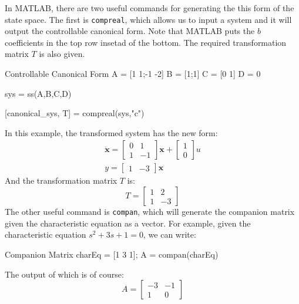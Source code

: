 In MATLAB, there are two useful commands for generating the this form of the state space. The first is \texttt{compreal}, which allows us to input a system and it will output the controllable canonical form. Note that MATLAB puts the $b$ coefficients in the top row insetad of the bottom. The required transformation matrix $T$ is also given.
\begin{matlabscript}{Controllable Canonical Form}
A = [1 1;-1 -2]
B = [1;1]
C = [0 1]
D = 0

sys = ss(A,B,C,D)

[canonical_sys, T] = compreal(sys,"c")
\end{matlabscript}
In this example, the transformed system has the new form:
\begin{gather}
\bm{\dot{x}}=\begin{bmatrix}
0&1\\1&-1
\end{bmatrix}\bm{x}+\begin{bmatrix}
    1\\0
\end{bmatrix}u\\
y=\begin{bmatrix}
    1&-3
\end{bmatrix}\bm{x}
\end{gather}
And the transformation matrix $T$ is:
$$T=\begin{bmatrix}
    1&2\\1&-3
\end{bmatrix}$$
The other useful command is \texttt{compan}, which will generate the companion matrix given the characteristic equation as a vector. For example, given the characteristic equation $s^2+3s+1=0$, we can write:
\begin{matlabscript}{Companion Matrix}
charEq = [1 3 1];
A = compan(charEq)
\end{matlabscript}
The output of which is of course:
$$A=\begin{bmatrix}
-3&-1\\1&0
\end{bmatrix}$$
